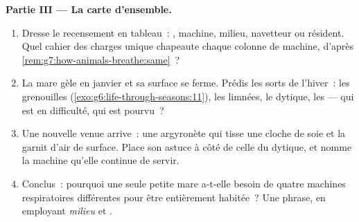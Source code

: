 \begin{problem}
\medskip\noindent\textbf{Partie III --- La carte d'ensemble.}
\begin{enumerate}[resume]
  \item Dresse le recensement en tableau~: , machine, milieu,
        navetteur ou résident. Quel cahier des charges unique
        chapeaute chaque colonne de machine, d'après
        \cref{rem:g7:how-animals-breathe:same}~?
  \item La mare gèle en janvier et sa surface se ferme. Prédis les
        sorts de l'hiver~: les grenouilles
        (\cref{exo:g6:life-through-seasons:11}), les limnées, le
        dytique, les  --- qui est en difficulté, qui est
        pourvu~?
  \item Une nouvelle venue arrive~: une argyronète qui tisse une
        cloche de soie et la garnit d'air de surface. Place son
        astuce à côté de celle du dytique, et nomme la machine
        qu'elle continue de servir.
  \item Conclus~: pourquoi une seule petite mare a-t-elle besoin de
        quatre machines respiratoires différentes pour être
        entièrement habitée~? Une phrase, en employant
        \emph{milieu} et \emph{}.
\end{enumerate}
\end{problem}
